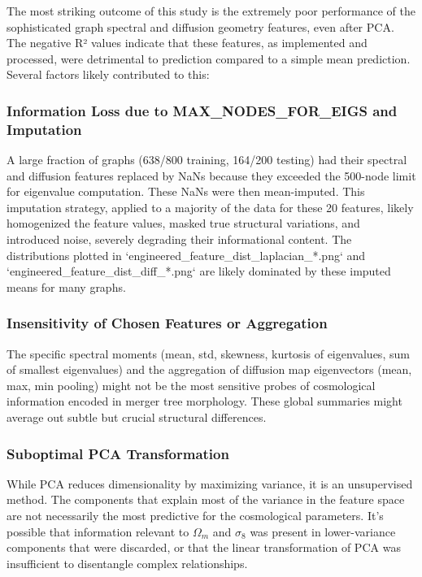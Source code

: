 \documentclass[twocolumn]{aastex631}
\begin{document}
The most striking outcome of this study is the extremely poor performance of the sophisticated graph spectral and diffusion geometry features, even after PCA. The negative R² values indicate that these features, as implemented and processed, were detrimental to prediction compared to a simple mean prediction. Several factors likely contributed to this:

\subsubsection{Information Loss due to MAX\_NODES\_FOR\_EIGS and Imputation}
A large fraction of graphs (638/800 training, 164/200 testing) had their spectral and diffusion features replaced by NaNs because they exceeded the 500-node limit for eigenvalue computation. These NaNs were then mean-imputed. This imputation strategy, applied to a majority of the data for these 20 features, likely homogenized the feature values, masked true structural variations, and introduced noise, severely degrading their informational content. The distributions plotted in `engineered\_feature\_dist\_laplacian\_*.png` and `engineered\_feature\_dist\_diff\_*.png` are likely dominated by these imputed means for many graphs.

\subsubsection{Insensitivity of Chosen Features or Aggregation}
The specific spectral moments (mean, std, skewness, kurtosis of eigenvalues, sum of smallest eigenvalues) and the aggregation of diffusion map eigenvectors (mean, max, min pooling) might not be the most sensitive probes of cosmological information encoded in merger tree morphology. These global summaries might average out subtle but crucial structural differences.

\subsubsection{Suboptimal PCA Transformation}
While PCA reduces dimensionality by maximizing variance, it is an unsupervised method. The components that explain most of the variance in the feature space are not necessarily the most predictive for the cosmological parameters. It's possible that information relevant to $\Omega_m$ and $\sigma_8$ was present in lower-variance components that were discarded, or that the linear transformation of PCA was insufficient to disentangle complex relationships.
\end{document}
